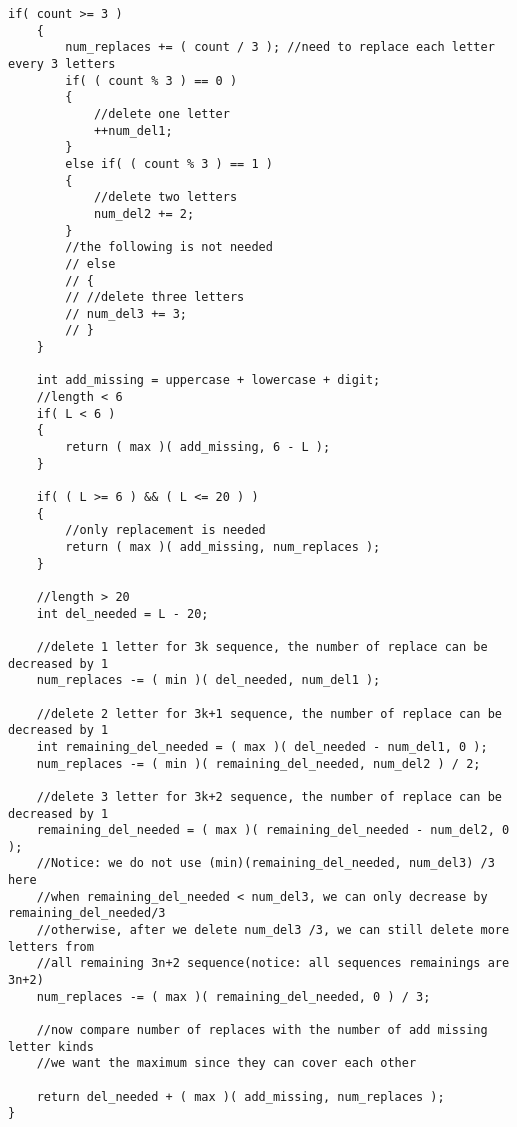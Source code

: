 \begin{lstlisting}[style=customc, caption={Change to $3\times n+2$ sequence}]
    if( count >= 3 )
    {
        num_replaces += ( count / 3 ); //need to replace each letter every 3 letters
        if( ( count % 3 ) == 0 )
        {
            //delete one letter
            ++num_del1;
        }
        else if( ( count % 3 ) == 1 )
        {
            //delete two letters
            num_del2 += 2;
        }
        //the following is not needed
        // else
        // {
        // //delete three letters
        // num_del3 += 3;
        // }
    }

    int add_missing = uppercase + lowercase + digit;
    //length < 6
    if( L < 6 )
    {
        return ( max )( add_missing, 6 - L );
    }

    if( ( L >= 6 ) && ( L <= 20 ) )
    {
        //only replacement is needed
        return ( max )( add_missing, num_replaces );
    }

    //length > 20
    int del_needed = L - 20;

    //delete 1 letter for 3k sequence, the number of replace can be decreased by 1
    num_replaces -= ( min )( del_needed, num_del1 );

    //delete 2 letter for 3k+1 sequence, the number of replace can be decreased by 1
    int remaining_del_needed = ( max )( del_needed - num_del1, 0 );
    num_replaces -= ( min )( remaining_del_needed, num_del2 ) / 2;

    //delete 3 letter for 3k+2 sequence, the number of replace can be decreased by 1
    remaining_del_needed = ( max )( remaining_del_needed - num_del2, 0 );
    //Notice: we do not use (min)(remaining_del_needed, num_del3) /3 here
    //when remaining_del_needed < num_del3, we can only decrease by remaining_del_needed/3
    //otherwise, after we delete num_del3 /3, we can still delete more letters from
    //all remaining 3n+2 sequence(notice: all sequences remainings are 3n+2)
    num_replaces -= ( max )( remaining_del_needed, 0 ) / 3;

    //now compare number of replaces with the number of add missing letter kinds
    //we want the maximum since they can cover each other

    return del_needed + ( max )( add_missing, num_replaces );
}

\end{lstlisting}

